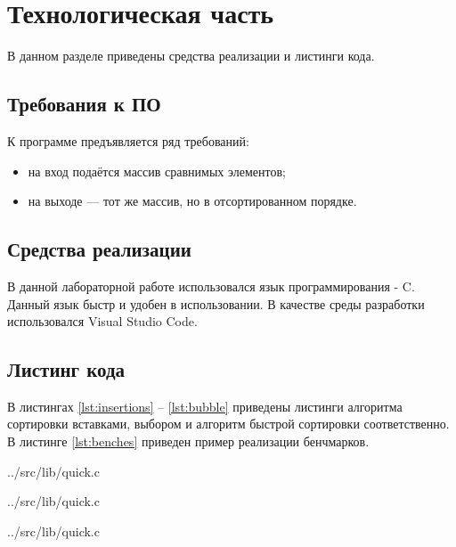 \chapter{Технологическая часть}

В данном разделе приведены средства реализации и листинги кода.

\section{Требования к ПО}

К программе предъявляется ряд требований:
\begin{itemize}
	\item на вход подаётся массив сравнимых элементов;
	\item на выходе — тот же массив, но в отсортированном порядке.
\end{itemize}

\section{Средства реализации}

В данной лабораторной работе использовался язык программирования - C. \cite{kernigan} Данный язык быстр и удобен в использовании. В качестве среды разработки использовался Visual Studio Code.  \cite{vscode}

\section{Листинг кода}

В листингах \ref{lst:insertions} -- \ref{lst:bubble} приведены листинги алгоритма сортировки вставками, выбором и алгоритм быстрой сортировки соответственно. В листинге \ref{lst:benches} приведен пример реализации бенчмарков.

\begin{lstinputlisting}[
	caption={Алгоритм сортировки вставками},
	label={lst:insertions},
	style={c},
	linerange={66-81}
]{../src/lib/quick.c}
\end{lstinputlisting}

\begin{lstinputlisting}[
caption={Алгоритм сортировки выбором},
	label={lst:selection},
	style={c},
	linerange={83-97}
]{../src/lib/quick.c}
\end{lstinputlisting}



\begin{lstinputlisting}[
	caption={Алгоритм быстрой сортировки},
	label={lst:bubble},
	style={c},
	linerange={26-63}
]{../src/lib/quick.c}
\end{lstinputlisting}



